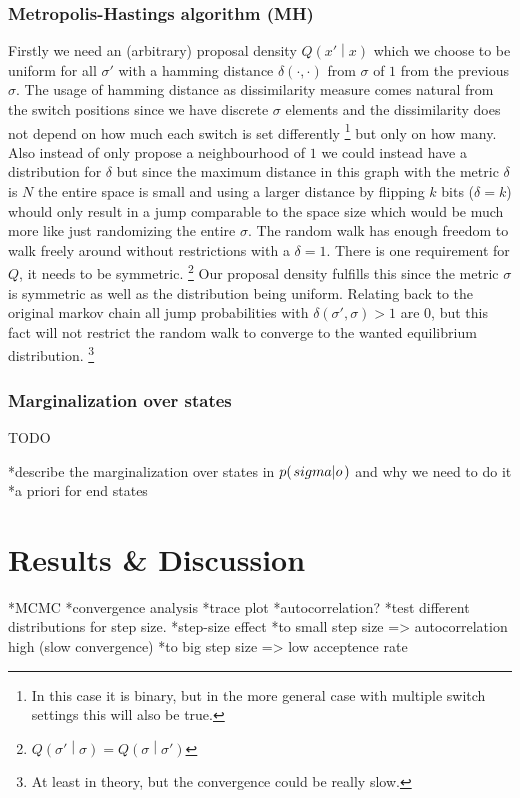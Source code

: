 \documentclass[a4paper,11pt]{kth-mag}
\begin{document}
            \subsection{Metropolis-Hastings algorithm (MH)}
                Firstly we need an (arbitrary) proposal density $Q\left(x'\middle\vert x\right)$
                which we choose to be uniform for all $\sigma'$ 
                with a hamming distance $\delta\left(\cdot,\cdot\right)$ from $\sigma$ 
                of $1$ from the previous $\sigma$.
                The usage of hamming distance as dissimilarity measure comes natural 
                from the switch positions since we have discrete $\sigma$ elements 
                and the dissimilarity does not depend on how much each switch is set 
                differently
                \footnote{In this case it is binary, but in the more general case with 
                multiple switch settings this will also be true.} 
                but only on how many.
                Also instead of only propose a neighbourhood of $1$ we could instead have a
                distribution for $\delta$ but since the maximum distance in this graph 
                with the metric $\delta$ is $N$ the entire space is small and using a 
                larger distance by flipping $k$ bits ($\delta=k$) whould only result in a jump 
                comparable to the space size which would be much more like 
                just randomizing the entire $\sigma$. The random walk has enough freedom to 
                walk freely around without restrictions with a $\delta=1$.
                There is one requirement for $Q$, it needs to be symmetric.
                \footnote{$Q\left(\sigma' \middle\vert \sigma\right)
                =Q\left(\sigma \middle\vert \sigma'\right) $}
                Our proposal density fulfills this since the metric $\sigma$ is symmetric 
                as well as the distribution being uniform.
                Relating back to the original markov chain all jump probabilities with 
                $\delta(\sigma',\sigma)>1$ are $0$, but this fact will not restrict the random
                walk to converge to the wanted equilibrium distribution.
                \footnote{At least in theory, but the convergence could be really slow.}
           
            \subsection{Marginalization over states}
                TODO

                *describe the marginalization over states in $p{(\left. sigma \middle\vert o \right.)}$ and why we need
                to do it
                *a priori for end states


    \chapter{Results \& Discussion}
        *MCMC
            *convergence analysis
                *trace plot
                *autocorrelation?
                *test different distributions for step size.
                    *step-size effect
                        *to small step size => autocorrelation high (slow convergence)
                        *to big step size => low acceptence rate
\end{document}
